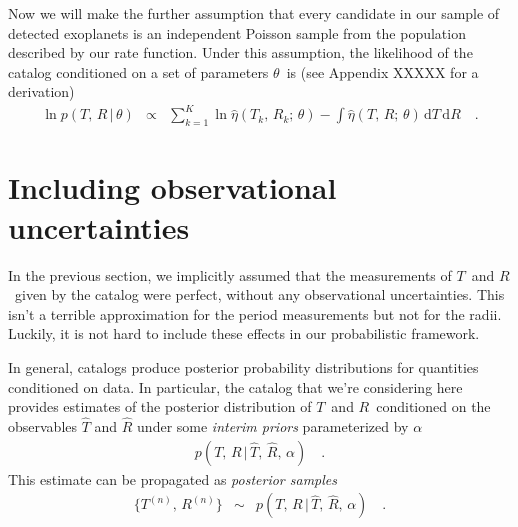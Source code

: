 \documentclass[12pt,preprint]{aastex}
\newcommand{\dd}{\ensuremath{\,\mathrm{d}}}
\newcommand{\rate}{\ensuremath{\eta}}
\newcommand{\ratepars}{\ensuremath{\theta}}
\newcommand{\obs}[1]{\ensuremath{\hat{#1}}}
\newcommand{\radius}{\ensuremath{R}}
\newcommand{\period}{\ensuremath{T}}
\newcommand{\interim}{\ensuremath{\alpha}}
\begin{document}
Now we will make the further assumption that every candidate in our sample of
detected exoplanets is an independent Poisson sample from the population
described by our rate function.
Under this assumption, the likelihood of the catalog conditioned on a set of
parameters \ratepars\ is (see Appendix XXXXX for a derivation)
\begin{eqnarray}
\ln p(\period,\,\radius\,|\,\ratepars) &\propto&
\sum_{k=1}^K \ln\obs{\rate} (\period_k,\,\radius_k;\,\ratepars)
- \int \obs{\rate} (\period,\,\radius;\,\ratepars) \dd\period\dd\radius
\quad.
\end{eqnarray}

\section{Including observational uncertainties}

In the previous section, we implicitly assumed that the measurements of
\period\ and \radius\ given by the catalog were perfect, without any
observational uncertainties.
This isn't a terrible approximation for the period measurements but not for
the radii.
Luckily, it is not hard to include these effects in our probabilistic
framework.

In general, catalogs produce posterior probability distributions for
quantities conditioned on data.
In particular, the catalog that we're considering here provides estimates of
the posterior distribution of \period\ and \radius\ conditioned on the
observables $\obs{\period}$ and $\obs{\radius}$ under some \emph{interim
priors} parameterized by \interim
\begin{eqnarray}
p(\period,\,\radius\,|\,\obs{\period},\,\obs{\radius},\,\interim) \quad.
\end{eqnarray}
This estimate can be propagated as \emph{posterior samples}
\begin{eqnarray}
\{\period^{(n)},\,\radius^{(n)}\} &\sim&
p(\period,\,\radius\,|\,\obs{\period},\,\obs{\radius},\,\interim) \quad.
\end{eqnarray}
\end{document}
